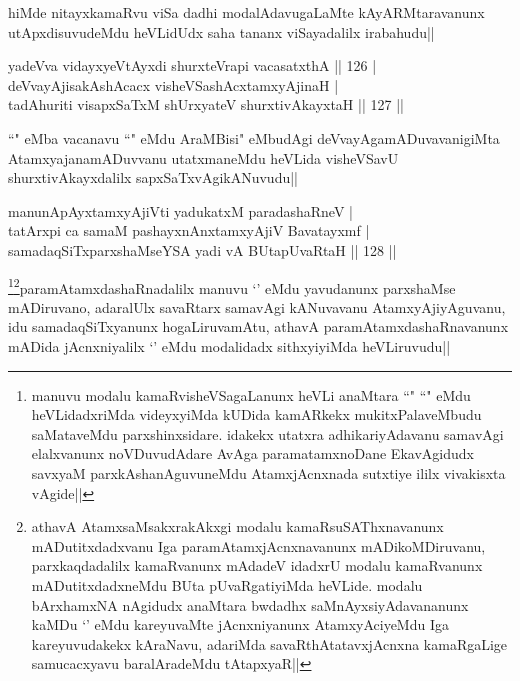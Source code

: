 \begin{artha}
hiMde nitayxkamaRvu viSa dadhi modalAdavugaLaMte kAyARMtaravanunx utApxdisuvudeMdu heVLidUdx saha tananx viSayadalilx irabahudu||
\end{artha}

\begin{shl}
yadeVva vidayxyeVtAyxdi shurxteVrapi vacasatxthA \hfill || 126 |\\
deVvayAjisakAshAcacx visheVSashAcx\s \s tamxyAjinaH |\\
tadAhuriti visapxSaTxM shUrxyateV shurxtivAkayxtaH \hfill || 127 ||
\end{shl}

\begin{artha}
``\stext" eMba vacanavu ``\stext" eMdu AraMBisi" eMbudAgi  deVvayAgamADuvavanigiMta AtamxyajanamADuvvanu utatxmaneMdu heVLida visheVSavU shurxtivAkayxdalilx sapxSaTxvAgikANuvudu||
\end{artha}

\begin{shl}
manunA\s pAyxtamxyAjiVti yadukatxM paradashaRneV |\\
tatArxpi ca samaM pashayxnAnxtamxyAjiV Bavatayxmf |\\
samadaqSiTxparxshaMseYSA yadi vA BUtapUvaRtaH \hfill || 128 ||
\end{shl}

\begin{artha}
\footnote{manuvu modalu kamaRvisheVSagaLanunx heVLi anaMtara ``\stext" ``\stext" eMdu heVLidadxriMda videyxyiMda kUDida kamARkekx mukitxPalaveMbudu saMataveMdu parxshinxsidare. idakekx utatxra adhikariyAdavanu samavAgi elalxvanunx noVDuvudAdare AvAga paramatamxnoDane EkavAgidudx savxyaM parxkAshanAguvuneMdu AtamxjAcnxnada sutxtiye ililx vivakisxta vAgide||}\footnote{athavA AtamxsaMsakxrakAkxgi modalu kamaRsuSAThxnavanunx mADutitxdadxvanu Iga paramAtamxjAcnxnavanunx  mADikoMDiruvanu, parxkaqdadalilx kamaRvanunx mAdadeV idadxrU modalu kamaRvanunx mADutitxdadxneMdu BUta pUvaRgatiyiMda heVLide. modalu bArxhamxNA nAgidudx anaMtara bwdadhx saMnAyxsiyAdavananunx kaMDu `\stext' eMdu kareyuvaMte jAcnxniyanunx AtamxyAciyeMdu Iga kareyuvudakekx kAraNavu, adariMda savaRthAtatavxjAcnxna kamaRgaLige samucacxyavu baralAradeMdu tAtapxyaR||}paramAtamxdashaRnadalilx manuvu `\stext' eMdu yavudanunx parxshaMse mADiruvano, adaralUlx savaRtarx samavAgi kANuvavanu AtamxyAjiyAguvanu, idu samadaqSiTxyanunx hogaLiruvamAtu, athavA paramAtamxdashaRnavanunx mADida jAcnxniyalilx `\stext' eMdu modalidadx sithxyiyiMda heVLiruvudu||
\end{artha}

